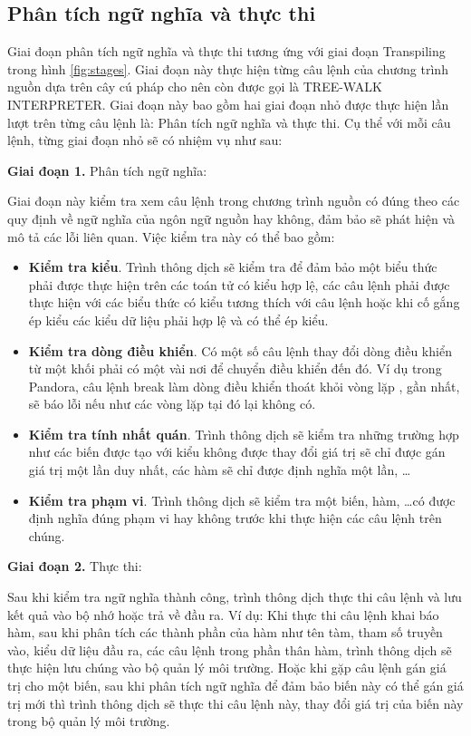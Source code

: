 \subsection{Phân tích ngữ nghĩa và thực thi}

Giai đoạn phân tích ngữ nghĩa và thực thi tương ứng với giai đoạn Transpiling 
trong hình \ref{fig:stages}. Giai đoạn này thực hiện từng câu lệnh của chương trình nguồn dựa trên cây cú pháp cho nên còn được gọi là TREE-WALK INTERPRETER. Giai đoạn này bao gồm hai giai đoạn nhỏ được thực hiện lần lượt trên từng câu lệnh là: Phân tích ngữ nghĩa và thực thi. Cụ thể với mỗi câu lệnh, từng giai đoạn nhỏ sẽ có nhiệm vụ như sau:

\textbf{Giai đoạn 1.} Phân tích ngữ nghĩa: 

Giai đoạn này kiểm tra xem câu lệnh trong chương trình nguồn có đúng theo các quy định về ngữ nghĩa của ngôn ngữ nguồn hay không, đảm bảo sẽ phát hiện và mô tả các lỗi liên quan. Việc kiểm tra này có thể bao gồm: 
\label{ch1:semantic}
\begin{itemize}
    \item \textbf{Kiểm tra kiểu}. Trình thông dịch sẽ kiểm tra để đảm bảo một biểu thức phải được thực hiện trên các toán tử có kiểu hợp lệ, các câu lệnh phải được thực hiện với các biểu thức có kiểu tương thích với câu lệnh hoặc khi cố gắng ép kiểu các kiểu dữ liệu phải hợp lệ và có thể ép kiểu.
    \item \textbf{Kiểm tra dòng điều khiển}. Có một số câu lệnh thay đổi dòng điều khiển từ một khối phải có một vài nơi để chuyển điều khiển đến đó. Ví dụ trong Pandora, câu lệnh break làm dòng điều khiển thoát khỏi vòng lặp ,  gần nhất, sẽ báo lỗi nếu như các vòng lặp tại đó lại không có.
    \item \textbf{Kiểm tra tính nhất quán}. Trình thông dịch sẽ kiểm tra những trường hợp như các biến được tạo với kiểu không được thay đổi giá trị sẽ chỉ được gán giá trị một lần duy nhất, các hàm sẽ chỉ được định nghĩa một lần, \dots
    \item \textbf{Kiểm tra phạm vi}. Trình thông dịch sẽ kiểm tra một biến, hàm, \dots có được định nghĩa đúng phạm vi hay không trước khi thực hiện các câu lệnh trên chúng.
\end{itemize}

\textbf{Giai đoạn 2.} Thực thi: 

Sau khi kiểm tra ngữ nghĩa thành công, trình thông dịch thực thi câu lệnh và lưu kết quả vào bộ nhớ hoặc trả về đầu ra. Ví dụ: Khi thực thi câu lệnh khai báo hàm, sau khi phân tích các thành phần của hàm như tên tàm, tham số truyền vào, kiểu dữ liệu đầu ra, các câu lệnh trong phần thân hàm, trình thông dịch sẽ thực hiện lưu chúng vào bộ quản lý môi trường. Hoặc khi gặp câu lệnh gán giá trị cho một biến, sau khi phân tích ngữ nghĩa để đảm bảo biến này có thể gán giá trị mới thì trình thông dịch sẽ thực thi câu lệnh này, thay đổi giá trị của biến này trong bộ quản lý môi trường.